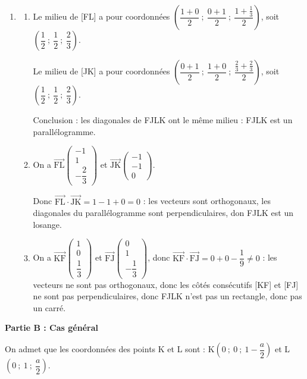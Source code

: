 \documentclass[10pt]{article}
\providecommand{\vect}[1]{\overrightarrow{#1}}
\begin{document}
\begin{enumerate}
\begin{enumerate}
L$\left(0~;~1~;~ \frac{1}{3}\right)$.
	\end{enumerate}
\item
	\begin{enumerate}
		\item 
Le milieu de [FL] a pour coordonnées $\left(\dfrac{1 + 0}{2}~;~\dfrac{0 + 1}{2}~;~\dfrac{1 + \frac{1}{3}}{2} \right)$, soit $\left(\dfrac{1}{2}~;~\dfrac{1}{2}~;~\dfrac{2}{3} \right)$.

Le milieu de [JK] a pour coordonnées $\left(\dfrac{0 + 1}{2}~;~\dfrac{1 + 0}{2}~;~\dfrac{\frac{2}{3} + \frac{2}{3}}{2} \right)$, soit $\left(\dfrac{1}{2}~;~\dfrac{1}{2}~;~\dfrac{2}{3} \right)$.

Conclusion : les diagonales de FJLK ont le même milieu : FJLK est un parallélogramme.
		\item 
		On a $\vect{\text{FL}}\begin{pmatrix}-1\\1\\- \dfrac{2}{3}\end{pmatrix}$ et  $\vect{\text{JK}}\begin{pmatrix}-1\\-1\\ 0\end{pmatrix}$.
	
	Donc $\vect{\text{FL}} \cdot \vect{\text{JK}} = 1 - 1 + 0 = 0$ : les vecteurs sont orthogonaux, les diagonales du parallélogramme sont perpendiculaires, don FJLK est un losange.
		\item 
		On a $\vect{\text{KF}}\begin{pmatrix}1\\0\\\dfrac{1}{3}\end{pmatrix}$ et $\vect{\text{FJ}}\begin{pmatrix}0\\1\\-\dfrac{1}{3}\end{pmatrix}$, donc $\vect{\text{KF}} \cdot \vect{\text{FJ}} = 0 + 0 - \dfrac{1}{9} \ne 0$ : les vecteurs ne sont pas orthogonaux, donc les côtés consécutifs [KF] et [FJ] ne sont pas perpendiculaires, donc FJLK n'est pas un rectangle, donc pas un carré.
	\end{enumerate}
\end{enumerate}

\bigskip

\textbf{Partie B : Cas général}

\medskip

On admet que les coordonnées des points K et L sont : K$\left(0~;~0~;~1- \dfrac{a}{2}\right)$ et L$\left(0~;~1~;~\dfrac{a}{2}\right)$.
\end{document}
